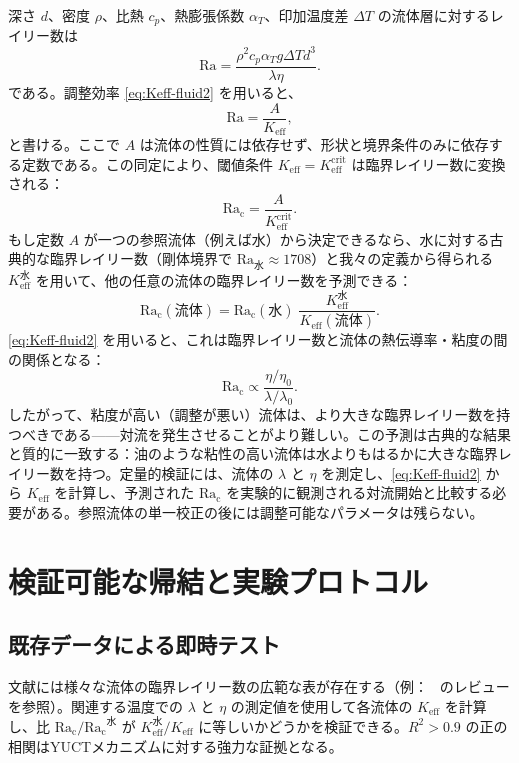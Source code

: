 \documentclass[12pt,a4paper]{article}
\begin{document}
	深さ \(d\)、密度 \(\rho\)、比熱 \(c_p\)、熱膨張係数 \(\alpha_T\)、印加温度差 \(\Delta T\) の流体層に対するレイリー数は
	\begin{equation}
		\mathrm{Ra} = \frac{\rho^2 c_p \alpha_T g \Delta T d^3}{\lambda \eta}.
	\end{equation}
	である。調整効率 \eqref{eq:Keff-fluid2} を用いると、
	\begin{equation}
		\mathrm{Ra} = \frac{A}{K_{\mathrm{eff}}},
	\end{equation}
	と書ける。ここで \(A\) は流体の性質には依存せず、形状と境界条件のみに依存する定数である。この同定により、閾値条件 \(K_{\mathrm{eff}} = K_{\mathrm{eff}}^{\mathrm{crit}}\) は臨界レイリー数に変換される：
	\begin{equation}\label{eq:Racrit}
		\mathrm{Ra_c} = \frac{A}{K_{\mathrm{eff}}^{\mathrm{crit}}}.
	\end{equation}
	もし定数 \(A\) が一つの参照流体（例えば水）から決定できるなら、水に対する古典的な臨界レイリー数（剛体境界で \(\mathrm{Ra}_{\text{水}} \approx 1708\)）と我々の定義から得られる \(K_{\mathrm{eff}}^{\text{水}}\) を用いて、他の任意の流体の臨界レイリー数を予測できる：
	\begin{equation}\label{eq:Racrit-predict}
		\boxed{ \mathrm{Ra_c}(\text{流体}) = \mathrm{Ra_c}(\text{水}) \;
			\frac{K_{\mathrm{eff}}^{\text{水}}}{K_{\mathrm{eff}}(\text{流体})} }.
	\end{equation}
	\eqref{eq:Keff-fluid2} を用いると、これは臨界レイリー数と流体の熱伝導率・粘度の間の関係となる：
	\begin{equation}
		\mathrm{Ra_c} \propto \frac{\eta / \eta_0}{\lambda / \lambda_0}.
	\end{equation}
	したがって、粘度が高い（調整が悪い）流体は、より大きな臨界レイリー数を持つべきである——対流を発生させることがより難しい。この予測は古典的な結果と質的に一致する：油のような粘性の高い流体は水よりもはるかに大きな臨界レイリー数を持つ。定量的検証には、流体の \(\lambda\) と \(\eta\) を測定し、\eqref{eq:Keff-fluid2} から \(K_{\mathrm{eff}}\) を計算し、予測された \(\mathrm{Ra_c}\) を実験的に観測される対流開始と比較する必要がある。参照流体の単一校正の後には調整可能なパラメータは残らない。
	
	\section{検証可能な帰結と実験プロトコル}
	
	\subsection{既存データによる即時テスト}
	文献には様々な流体の臨界レイリー数の広範な表が存在する（例：~\cite{Chandrasekhar1961, Cross1993} のレビューを参照）。関連する温度での \(\lambda\) と \(\eta\) の測定値を使用して各流体の \(K_{\mathrm{eff}}\) を計算し、比 \(\mathrm{Ra_c}/\mathrm{Ra_c}^{\text{水}}\) が \(K_{\mathrm{eff}}^{\text{水}} / K_{\mathrm{eff}}\) に等しいかどうかを検証できる。\(R^2 > 0.9\) の正の相関はYUCTメカニズムに対する強力な証拠となる。
	
\end{document}
